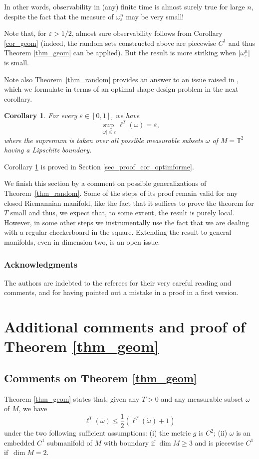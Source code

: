 \documentclass[JEP,XML,SOM,Unicode, NoEqCountersInSection,NoFloatCountersInSection,published]{cedram}
\newtheorem{corollary}{Corollary}
\theoremstyle{definition}
\begin{document}
In other words, observability in (any) finite time is almost surely true for large $n$, despite the fact that the measure of $\omega_\varepsilon^n$ may be very small!

Note that, for $\varepsilon>1/2$, almost sure observability follows from Corollary \ref{cor_geom} (indeed, the random sets constructed above are piecewise $C^1$ and thus Theorem \ref{thm_geom} can be applied). But the result is more striking when $\vert\omega_\varepsilon^n\vert$ is small.

Note also Theorem~\ref{thm_random} provides an answer to an issue raised in \cite{HebrardHumbert}, which we formulate in terms of an optimal shape design problem in the next corollary.

\begin{corollary}\label{cor_optimforme}
For every $\varepsilon \in [0,1]$, we have
\[
\displaystyle\sup_{|\omega| \leq \varepsilon} \ell^T(\omega)= \varepsilon,
\]
where the supremum is taken over all possible measurable subsets $\omega$ of $M=\mathbb{T}^2$ having a Lipschitz boundary.
\end{corollary}

Corollary \ref{cor_optimforme} is proved in Section \ref{sec_proof_cor_optimforme}.

We finish this section by a comment on possible generalizations of Theorem~\ref{thm_random}. Some of the steps of its proof remain valid for any closed Riemannian manifold, like the fact that it suffices to prove the theorem for $T$ small and thus, we expect that, to some extent, the result is purely local. However, in some other steps we instrumentally use the fact that we are dealing with a regular checkerboard in the square.
Extending the result to general manifolds, even in dimension two, is an open issue.

\subsubsection*{Acknowledgments}
The authors are indebted to the referees for their very careful reading and comments, and for having pointed out a mistake in a proof in a first version.

\section{Additional comments and proof of Theorem \ref{thm_geom}}\label{sec_geom}
\subsection{Comments on Theorem \ref{thm_geom}}
Theorem \ref{thm_geom} states that, given any $T>0$ and any measurable subset $\omega$ of $M$, we have
\[
\ell^T(\overline\omega) \leq \frac{1}{2} \left( \ell^T(\mathring{\omega}) + 1 \right)
\]
under the two following sufficient assumptions: (i) the metric $g$ is $C^2$; (ii) $\omega$ is an embedded $C^1$ submanifold of $M$ with boundary if $\dim M \geq 3$ and is piecewise $C^1$ if~$\dim M=2$.
\end{document}
